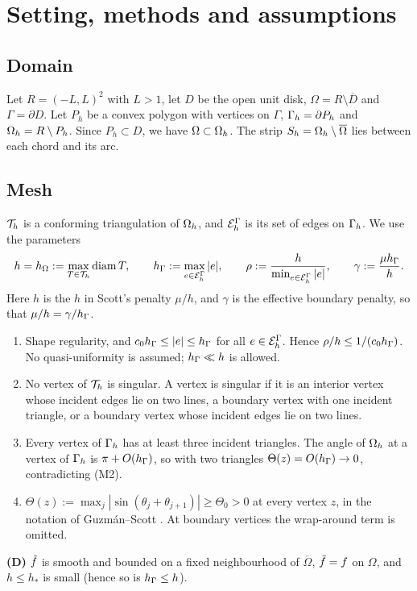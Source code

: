 \section{Setting, methods and assumptions}\label{sec:setting}

\subsection*{Domain}
Let $R=(-L,L)^2$ with $L>1$, let $D$ be the open unit disk, $\Omega=R\setminus\overline D$ and $\Gamma=\partial D$.
Let $P_h$ be a convex polygon with vertices on $\Gamma$, $\Gamma_h=\partial P_h$ and $\Omega_h=R\setminus P_h$. Since $P_h\subset D$, we have $\Omega\subset\Omega_h$. The strip $S_h=\Omega_h\setminus\overline\Omega$ lies between each chord and its arc.

\subsection*{Mesh}
$\mathcal T_h$ is a conforming triangulation of $\Omega_h$, and $\mathcal E_h^\Gamma$ is its set of edges on $\Gamma_h$. We use the parameters
\[
h=h_\Omega:=\max_{T\in\mathcal T_h}\operatorname{diam} T,\qquad
h_\Gamma:=\max_{e\in\mathcal E_h^\Gamma}|e|,\qquad
\rho:=\frac{h}{\min_{e\in\mathcal E_h^\Gamma}|e|},\qquad
\gamma:=\frac{\mu h_\Gamma}{h}.
\]
Here $h$ is the $h$ in Scott's penalty $\mu/h$, and $\gamma$ is the effective boundary penalty, so that $\mu/h=\gamma/h_\Gamma$.

\begin{assumption}\label{ass:mesh}\leavevmode
\begin{enumerate}[label=(M\arabic*),start=0]
\item Shape regularity, and $c_0h_\Gamma\le|e|\le h_\Gamma$ for all $e\in\mathcal E_h^\Gamma$. Hence $\rho/h\le1/(c_0h_\Gamma)$. No quasi-uniformity is assumed; $h_\Gamma\ll h$ is allowed.
\item No vertex of $\mathcal T_h$ is singular. A vertex is singular if it is an interior vertex whose incident edges lie on two lines, a boundary vertex with one incident triangle, or a boundary vertex whose incident edges lie on two lines.
\item[(M1$'$)] Every vertex of $\Gamma_h$ has at least three incident triangles. The angle of $\Omega_h$ at a vertex of $\Gamma_h$ is $\pi+O(h_\Gamma)$, so with two triangles $\Theta(z)=O(h_\Gamma)\to0$, contradicting (M2).
\item $\Theta(z):=\max_j|\sin(\theta_j+\theta_{j+1})|\ge\Theta_0>0$ at every vertex $z$, in the notation of Guzm\'an--Scott \cite{GuzmanScott2019}. At boundary vertices the wrap-around term is omitted.
\end{enumerate}
\textbf{(D)} $\tilde f$ is smooth and bounded on a fixed neighbourhood of $\overline\Omega$, $\tilde f=f$ on $\Omega$, and $h\le h_\ast$ is small (hence so is $h_\Gamma\le h$).
\end{assumption}

